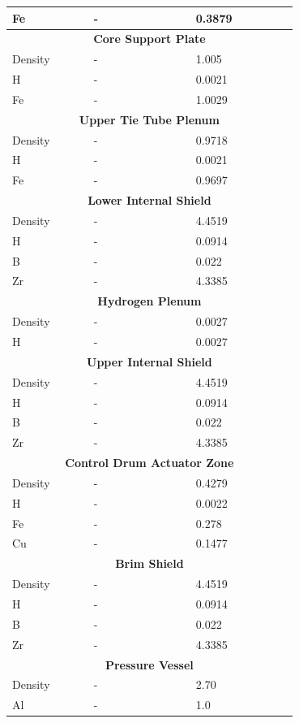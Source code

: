 \documentclass[8pt,a5paper]{article}
\begin{document}
\begin{longtable}{|m{0.2\linewidth}|m{0.25\linewidth}|m{0.25\linewidth}|}
    Fe & - & \SI{0.3879}{} \\\hline
    \multicolumn{3}{|c|}{\textbf{Core Support Plate}}\\\hline
    Density & - & \SI{1.005}{} \\
    H & - & \SI{0.0021}{} \\
    Fe & - & \SI{1.0029}{} \\\hline
    \multicolumn{3}{|c|}{\textbf{Upper Tie Tube Plenum}}\\\hline
    Density & - & \SI{0.9718}{} \\
    H & - & \SI{0.0021}{} \\
    Fe & - & \SI{0.9697}{} \\\hline
    \multicolumn{3}{|c|}{\textbf{Lower Internal Shield}}\\\hline
    Density & - & \SI{4.4519}{} \\
    H & - & \SI{0.0914}{} \\
    B & - & \SI{0.022}{} \\
    Zr & - & \SI{4.3385}{} \\\hline
    \multicolumn{3}{|c|}{\textbf{Hydrogen Plenum}}\\\hline
    Density & - & \SI{0.0027}{} \\
    H & - & \SI{0.0027}{} \\\hline
    \multicolumn{3}{|c|}{\textbf{Upper Internal Shield}}\\\hline
    Density & - & \SI{4.4519}{} \\
    H & - & \SI{0.0914}{} \\
    B & - & \SI{0.022}{} \\
    Zr & - & \SI{4.3385}{} \\\hline
    \multicolumn{3}{|c|}{\textbf{Control Drum Actuator Zone}}\\\hline
    Density & - & \SI{0.4279}{} \\
    H & - & \SI{0.0022}{} \\
    Fe & - & \SI{0.278}{} \\
    Cu & - & \SI{0.1477}{} \\\hline
    \multicolumn{3}{|c|}{\textbf{Brim Shield}}\\\hline
    Density & - & \SI{4.4519}{} \\
    H & - & \SI{0.0914}{} \\
    B & - & \SI{0.022}{} \\
    Zr & - & \SI{4.3385}{} \\\hline
    \multicolumn{3}{|c|}{\textbf{Pressure Vessel}}\\\hline
    Density & - & \SI{2.70}{} \\
    Al & - & \SI{1.0}{} 
\end{longtable}
\end{document}
